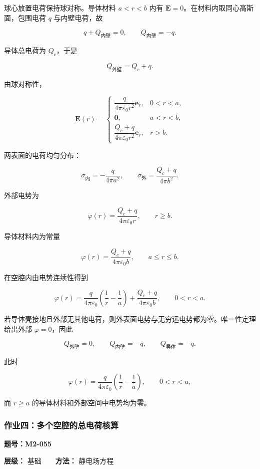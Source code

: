 球心放置电荷保持球对称。导体材料 \(a<r<b\) 内有
\(\mathbf E=0\)。在材料内取同心高斯面，包围电荷 \(q\) 与内壁电荷，故

\[
q+Q_{\text{内壁}}=0,
\qquad
Q_{\text{内壁}}=-q.
\]

导体总电荷为 \(Q_c\)，于是

\[
Q_{\text{外壁}}=Q_c+q.
\]

由球对称性，

\[
\mathbf E(r)=
\begin{cases}
\dfrac{q}{4\pi\varepsilon_0r^2}\mathbf e_r, & 0<r<a,\\[6pt]
\mathbf 0, & a<r<b,\\[4pt]
\dfrac{Q_c+q}{4\pi\varepsilon_0r^2}\mathbf e_r, & r>b.
\end{cases}
\]

两表面的电荷均匀分布：

\[
\sigma_{\text{内}}
=-\frac{q}{4\pi a^2},
\qquad
\sigma_{\text{外}}
=\frac{Q_c+q}{4\pi b^2}.
\]

外部电势为

\[
\varphi(r)=\frac{Q_c+q}{4\pi\varepsilon_0r},
\qquad r\ge b.
\]

导体材料内为常量

\[
\varphi(r)=\frac{Q_c+q}{4\pi\varepsilon_0b},
\qquad a\le r\le b.
\]

在空腔内由电势连续性得到

\[
\varphi(r)
=\frac{q}{4\pi\varepsilon_0}
\left(\frac1r-\frac1a\right)
+\frac{Q_c+q}{4\pi\varepsilon_0b},
\qquad 0<r<a.
\]

若导体壳接地且外部无其他电荷，则外表面电势与无穷远电势都为零。唯一性定理给出外部
\(\varphi=0\)，因此

\[
Q_{\text{外壁}}=0,
\qquad
Q_{\text{内壁}}=-q,
\qquad
Q_{\text{导体}}=-q.
\]

此时

\[
\varphi(r)=
\frac{q}{4\pi\varepsilon_0}
\left(\frac1r-\frac1a\right),
\qquad 0<r<a,
\]

而 \(r\ge a\) 的导体材料和外部空间中电势均为零。

\subsubsection{作业四：多个空腔的总电荷核算}\label{m2:ux4f5cux4e1aux56dbux591aux4e2aux7a7aux8154ux7684ux603bux7535ux8377ux6838ux7b97}

\textbf{题号：M2-055}

\textbf{层级：} 基础　　\textbf{方法：} 静电场方程

